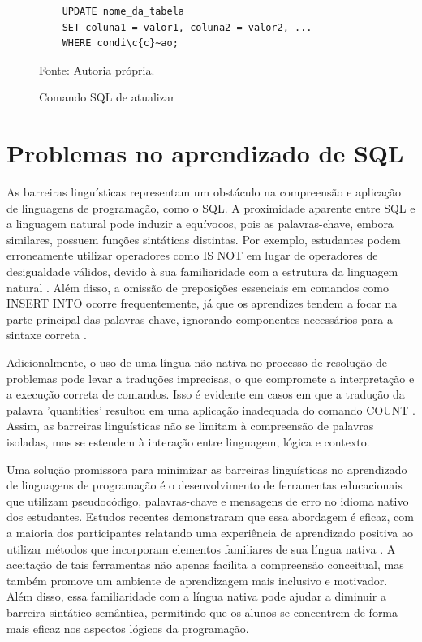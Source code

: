 \begin{figure}[H]
    \centering
    \begin{lstlisting}
    UPDATE nome_da_tabela
    SET coluna1 = valor1, coluna2 = valor2, ...
    WHERE condi\c{c}~ao;
    \end{lstlisting}
    \caption{Comando SQL de atualizar}
    Fonte: Autoria própria.
    \label{lst:delete}
\end{figure}

\section{Problemas no aprendizado de SQL}

As barreiras linguísticas representam um obstáculo na compreensão e aplicação de linguagens de programação, como o SQL. A proximidade aparente entre SQL e a linguagem natural pode induzir a equívocos, pois as palavras-chave, embora similares, possuem funções sintáticas distintas. Por exemplo, estudantes podem erroneamente utilizar operadores como IS NOT em lugar de operadores de desigualdade válidos, devido à sua familiaridade com a estrutura da linguagem natural \cite{Miedema2021}. Além disso, a omissão de preposições essenciais em comandos como INSERT INTO ocorre frequentemente, já que os aprendizes tendem a focar na parte principal das palavras-chave, ignorando componentes necessários para a sintaxe correta \cite{Miedema2021}.

Adicionalmente, o uso de uma língua não nativa no processo de resolução de problemas pode levar a traduções imprecisas, o que compromete a interpretação e a execução correta de comandos. Isso é evidente em casos em que a tradução da palavra 'quantities' resultou em uma aplicação inadequada do comando COUNT \cite{Miedema2021}. Assim, as barreiras linguísticas não se limitam à compreensão de palavras isoladas, mas se estendem à interação entre linguagem, lógica e contexto.

Uma solução promissora para minimizar as barreiras linguísticas no aprendizado de linguagens de programação é o desenvolvimento de ferramentas educacionais que utilizam pseudocódigo, palavras-chave e mensagens de erro no idioma nativo dos estudantes. Estudos recentes demonstraram que essa abordagem é eficaz, com a maioria dos participantes relatando uma experiência de aprendizado positiva ao utilizar métodos que incorporam elementos familiares de sua língua nativa \cite{ImpactCalango2020}. A aceitação de tais ferramentas não apenas facilita a compreensão conceitual, mas também promove um ambiente de aprendizagem mais inclusivo e motivador. Além disso, essa familiaridade com a língua nativa pode ajudar a diminuir a barreira sintático-semântica, permitindo que os alunos se concentrem de forma mais eficaz nos aspectos lógicos da programação.

